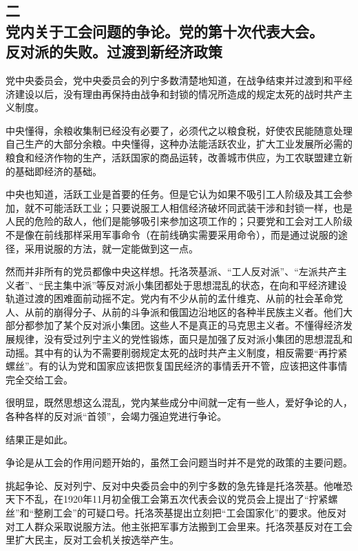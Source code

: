 \subsection[二\q 党内关于工会问题的争论。党的第十次代表大会。反对派的失败。过渡到新经济政策]{二\\党内关于工会问题的争论。党的第十次代表大会。\\反对派的失败。过渡到新经济政策}

党中央委员会，党中央委员会的列宁多数清楚地知道，在战争结束并过渡到和平经济建设以后，没有理由再保持由战争和封锁的情况所造成的规定太死的战时共产主义制度。

中央懂得，余粮收集制已经没有必要了，必须代之以粮食税，好使农民能随意处理自己生产的大部分余粮。中央懂得，这种办法能活跃农业，扩大工业发展所必需的粮食和经济作物的生产，活跃国家的商品运转，改善城市供应，为工农联盟建立新的基础即经济的基础。

中央也知道，活跃工业是首要的任务。但是它认为如果不吸引工人阶级及其工会参加，就不可能活跃工业；只要说服工人相信经济破坏同武装干涉和封锁一样，也是人民的危险的敌人，他们是能够吸引来参加这项工作的；只要党和工会对工人阶级不是像在前线那样采用军事命令（在前线确实需要采用命令），而是通过说服的途径，采用说服的方法，就一定能做到这一点。

然而并非所有的党员都像中央这样想。托洛茨基派、“工人反对派”、“左派共产主义者”、“民主集中派”等反对派小集团都处于思想混乱的状态，在向和平经济建设轨道过渡的困难面前动摇不定。党内有不少从前的孟什维克、从前的社会革命党人、从前的崩得分子、从前的斗争派和俄国边沿地区的各种半民族主义者。他们大部分都参加了某个反对派小集团。这些人不是真正的马克思主义者。不懂得经济发展规律，没有受过列宁主义的党性锻炼，面只是加强了反对派小集团的思想混乱和动摇。其中有的认为不需要削弱规定太死的战时共产主义制度，相反需要“再拧紧螺丝”。有的认为党和国家应该把恢复国民经济的事情丢开不管，应该把这件事情完全交给工会。

很明显，既然思想这么混乱，党内某些成分中间就一定有一些人，爱好争论的人，各种各样的反对派“首领”，会竭力强迫党进行争论。

结果正是如此。

争论是从工会的作用问题开始的，虽然工会问题当时并不是党的政策的主要问题。

挑起争论、反对列宁、反对中央委员会中的列宁多数的急先锋是托洛茨基。他唯恐天下不乱，在1920年11月初全俄工会第五次代表会议的党员会上提出了“拧紧螺丝”和“整刷工会”的可疑口号。托洛茨基提出立刻把“工会国家化”的要求。他反对对工人群众采取说服方法。他主张把军事方法搬到工会里来。托洛茨基反对在工会里扩大民主，反对工会机关按选举产生。

